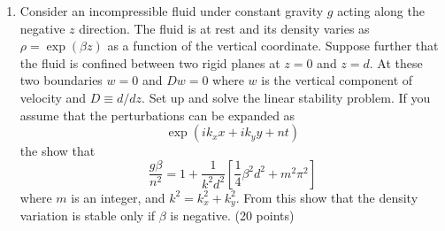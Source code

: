 \documentclass[a4paper,twoside,10pt]{article}
\begin{document}
\begin {enumerate}
\item Consider an incompressible fluid under constant gravity $g$
  acting along the negative $z$ direction.  The fluid is at rest and
its density varies as $\rho = \exp(\beta z)$ as a function of the 
vertical coordinate. Suppose further that the fluid is confined
between two rigid planes at $z=0$ and $z=d$.  At these two boundaries
$w = 0$ and $D w = 0 $ where $w$ is the vertical component of
velocity and $D \equiv d/dz$. Set up and solve the linear stability
problem. If you assume that the perturbations can be expanded as 
\begin{equation}
      \exp(ik_x x + ik_y y + nt)
\end{equation} 
the show that 
\begin{equation}
      \frac{g\beta}{n^2}  = 1 + \frac{1}{k^2 d^2} \left[ \frac{1}{4}
        \beta^2 d^2 + m^2 \pi^2 \right]
\end{equation}
where $m$ is an integer, and $k^2 = k_x^2 + k_y^2$.
From this show that the density variation is stable only if $\beta$ is
negative. (20 points)  


\end{enumerate}
\end{document}
